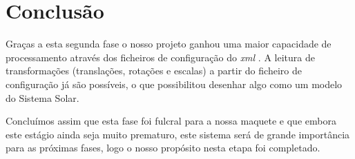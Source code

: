 \documentclass[11pt,a4paper]{report}
\begin{document}
\chapter{Conclusão}

Graças a esta segunda fase o nosso projeto ganhou uma maior capacidade de processamento através dos ficheiros de configuração do \emph{xml} .
A leitura de transformações (translações, rotações e escalas) a partir do ficheiro de configuração já são possíveis, o que possibilitou desenhar algo como um modelo do Sistema Solar.

Concluímos assim que esta fase foi fulcral para a nossa maquete e que embora este estágio ainda seja muito prematuro, este sistema será de grande importância para as próximas fases, logo o nosso propósito nesta etapa foi completado.
\end{document}
